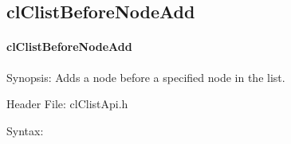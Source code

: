 \begin{flushleft}
\subsection{clClistBeforeNodeAdd}
\hypertarget{pagecl105}{}\paragraph{cl\-Clist\-Before\-Node\-Add}\label{pagecl105}
\begin{Desc}
\item[Synopsis:]Adds a node before a specified node in the list.\end{Desc}
\begin{Desc}
\item[Header File:]clClistApi.h\end{Desc}
\begin{Desc}
\item[Syntax:]


\end{Desc}
\end{flushleft}
